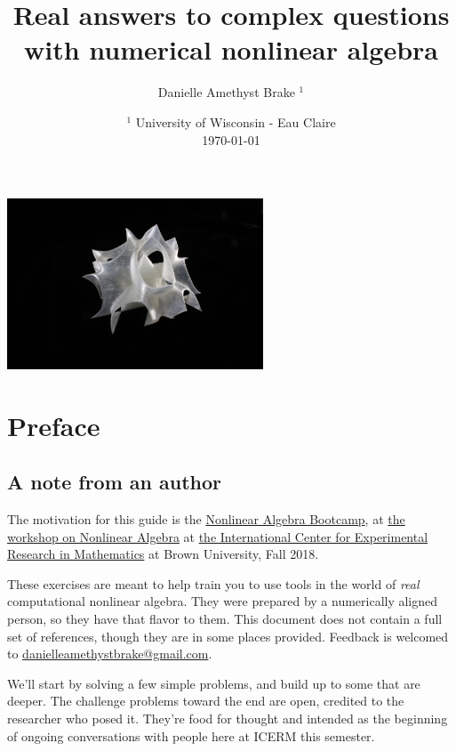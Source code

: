 \documentclass[letter,portrait]{article}
\title{Real answers to complex questions with numerical nonlinear algebra}
\author{Danielle Amethyst Brake $^1$} %
\date{$^1$ University of Wisconsin - Eau Claire \\[\baselineskip] \today} %
\newcommand{\1}{{\tt \_1}}
\newcommand{\2}{{\tt \_2}}
\begin{document}
\maketitle
\thispagestyle{empty}
\vfill
\begin{center}
\includegraphics[width=3in]{diagrams/ICERM_surface_printed.jpg}
\end{center}
\vfill
\clearpage


\pagestyle{plain} 
  \setcounter{page}{1}

\tableofcontents
  \eject
  \setcounter{page}{1}
  \eject

\clearpage


\section{Preface}

\subsection{A note from an author}
The motivation for this guide is the \href{https://icerm.brown.edu/programs/sp-f18/w4/}{Nonlinear Algebra Bootcamp}, at \href{https://icerm.brown.edu/programs/sp-f18/}{the workshop on Nonlinear Algebra}  at \href{https://icerm.brown.edu/}{the International Center for Experimental Research in Mathematics} at Brown University, Fall 2018.  

These exercises are meant to help train you to use tools in the world of {\em real} computational nonlinear algebra.  They were prepared by a numerically aligned person, so they have that flavor to them.  This document does not contain a full set of references, though they are in some places provided.  Feedback is welcomed to \href{mailto:danielleamethystbrake@gmail.com}{danielleamethystbrake@gmail.com}.

We'll start by solving a few simple problems, and build up to some that are deeper.  The challenge problems toward the end are open, credited to the researcher who posed it.  They're food for thought and intended as the beginning of ongoing conversations with people here at ICERM this semester.  
\end{document}
